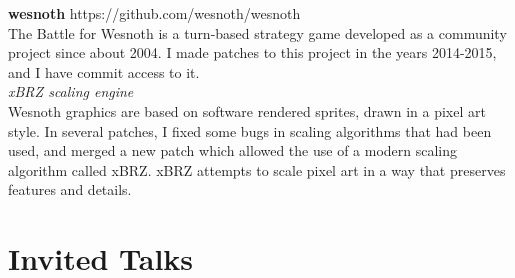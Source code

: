 \documentclass[margin,line]{resume}
\begin{document}
\begin{resume}
    \textbf{wesnoth} \hfill https://github.com/wesnoth/wesnoth \\
    The Battle for Wesnoth is a turn-based strategy game developed as a community project since about 2004.
    I made patches to this project in the years 2014-2015, and I have commit access to it. \\
    \textsl{xBRZ scaling engine} \\ Wesnoth graphics are based on software rendered sprites, drawn in a pixel art style. In several patches,
    I fixed some bugs in scaling algorithms that had been used, and merged a new patch which allowed the use of a modern scaling algorithm
    called xBRZ. xBRZ attempts to scale pixel art in a way that preserves features and details. \\


    \section{\mysidestyle Invited Talks}


\end{resume}
\end{document}
